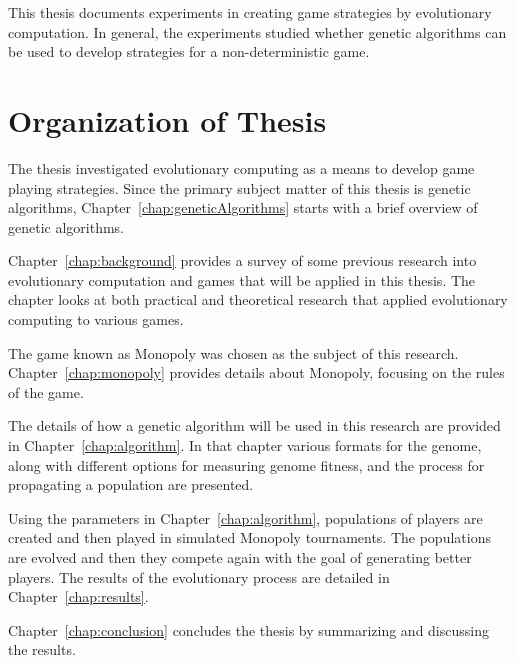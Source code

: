 This thesis documents experiments in creating game strategies by evolutionary
computation. In general, the experiments studied whether genetic algorithms can
be used to develop strategies for a non-deterministic game.

\section{Organization of Thesis}

The thesis investigated evolutionary computing as a means to develop game
playing strategies. Since the primary subject matter of this thesis is genetic
algorithms, Chapter~\ref{chap:geneticAlgorithms} starts with a brief overview of
genetic algorithms.

Chapter~\ref{chap:background} provides a survey of some previous research into
evolutionary computation and games that will be applied in this thesis. The chapter
looks at both practical and theoretical research that applied evolutionary
computing to various games.

The game known as Monopoly was chosen as the subject of this research.
Chapter~\ref{chap:monopoly} provides details about Monopoly, focusing on the
rules of the game.

The details of how a genetic algorithm will be used in this research are provided
in Chapter~\ref{chap:algorithm}. In that chapter various formats for the genome,
along with different options for measuring genome fitness, and the process for
propagating a population are presented.

Using the parameters in Chapter~\ref{chap:algorithm}, populations of players are
created and then played in simulated Monopoly tournaments. The populations are
evolved and then they compete again with the goal of generating better players.
The results of the evolutionary process are detailed in
Chapter~\ref{chap:results}.

Chapter~\ref{chap:conclusion} concludes the thesis by summarizing and discussing
the results.

